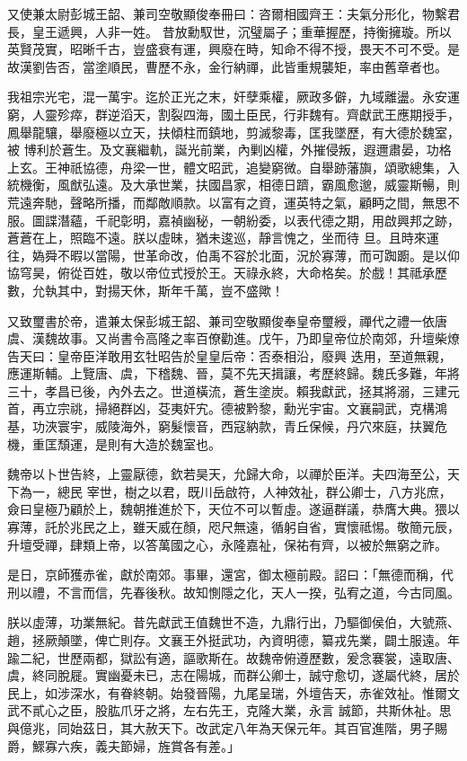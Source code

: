 \begin{pinyinscope}
 又使兼太尉彭城王韶、兼司空敬顯俊奉冊曰：咨爾相國齊王：夫氣分形化，物繫君長，皇王遞興，人非一姓。
 昔放勳馭世，沉璧屬子；重華握歷，持衡擁璇。所以英賢茂實，昭晰千古，豈盛衰有運，興廢在時，知命不得不授，畏天不可不受。是故漢劉告否，當塗順民，曹歷不永，金行納禪，此皆重規襲矩，率由舊章者也。



 我祖宗光宅，混一萬宇。迄於正光之末，奸孽乘權，厥政多僻，九域離盪。永安運窮，人靈殄瘁，群逆滔天，割裂四海，國土臣民，行非魏有。齊獻武王應期授手，鳳舉龍驤，舉廢極以立天，扶傾柱而鎮地，剪滅黎毒，匡我墜歷，有大德於魏室，被
 博利於蒼生。及文襄繼軌，誕光前業，內剿凶權，外摧侵叛，遐邇肅晏，功格上玄。王神祇協德，舟梁一世，體文昭武，追變窮微。自舉跡藩旟，頌歌總集，入統機衡，風猷弘遠。及大承世業，扶國昌家，相德日躋，霸風愈邈，威靈斯暢，則荒遠奔馳，聲略所播，而鄰敵順款。以富有之資，運英特之氣，顧眄之間，無思不服。圖諜潛蘊，千祀彰明，嘉禎幽秘，一朝紛委，以表代德之期，用啟興邦之跡，蒼蒼在上，照臨不遠。朕以虛昧，猶未逡巡，靜言愧之，坐而待
 旦。且時來運往，媯舜不暇以當陽，世革命改，伯禹不容於北面，況於寡薄，而可踟躕。是以仰協穹昊，俯從百姓，敬以帝位式授於王。天祿永終，大命格矣。於戲！其祗承歷數，允執其中，對揚天休，斯年千萬，豈不盛歟！



 又致璽書於帝，遣兼太保彭城王韶、兼司空敬顯俊奉皇帝璽綬，禪代之禮一依唐虞、漢魏故事。又尚書令高隆之率百僚勸進。戊午，乃即皇帝位於南郊，升壇柴燎告天曰：皇帝臣洋敢用玄牡昭告於皇皇后帝：否泰相沿，廢興
 迭用，至道無親，應運斯輔。上覽唐、虞，下稽魏、晉，莫不先天揖讓，考歷終歸。魏氏多難，年將三十，孝昌已後，內外去之。世道橫流，蒼生塗炭。賴我獻武，拯其將溺，三建元首，再立宗祧，掃絕群凶，芟夷奸宄。德被黔黎，勳光宇宙。文襄嗣武，克構鴻基，功浹寰宇，威陵海外，窮髮懷音，西寇納款，青丘保候，丹穴來庭，扶翼危機，重匡頹運，是則有大造於魏室也。



 魏帝以卜世告終，上靈厭德，欽若昊天，允歸大命，以禪於臣洋。夫四海至公，天下為一，總民
 宰世，樹之以君，既川岳啟符，人神效祉，群公卿士，八方兆庶，僉曰皇極乃顧於上，魏朝推進於下，天位不可以暫虛。遂逼群議，恭膺大典。猥以寡薄，託於兆民之上，雖天威在顏，咫尺無遠，循躬自省，實懷祗惕。敬簡元辰，升壇受禪，肆類上帝，以答萬國之心，永隆嘉祉，保祐有齊，以被於無窮之祚。



 是日，京師獲赤雀，獻於南郊。事畢，還宮，御太極前殿。詔曰：「無德而稱，代刑以禮，不言而信，先春後秋。故知惻隱之化，天人一揆，弘宥之道，今古同風。



 朕以虛薄，功業無紀。昔先獻武王值魏世不造，九鼎行出，乃驅御侯伯，大號燕、趙，拯厥顛墜，俾亡則存。文襄王外挺武功，內資明德，纂戎先業，闢土服遠。年踰二紀，世歷兩都，獄訟有適，謳歌斯在。故魏帝俯遵歷數，爰念褰裳，遠取唐、虞，終同脫屣。實幽憂未已，志在陽城，而群公卿士，誠守愈切，遂屬代終，居於民上，如涉深水，有眷終朝。始發晉陽，九尾呈瑞，外壇告天，赤雀效祉。惟爾文武不貳心之臣，股肱爪牙之將，左右先王，克隆大業，永言
 誠節，共斯休祉。思與億兆，同始茲日，其大赦天下。改武定八年為天保元年。其百官進階，男子賜爵，鰥寡六疾，義夫節婦，旌賞各有差。」




\end{pinyinscope}
